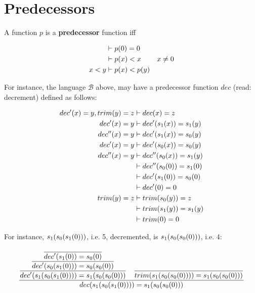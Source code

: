 \section{Predecessors}

\begin{definition}

A function $p$ is a \textbf{predecessor} function iff


\begin{align}
&\vdash p\p{0} = 0 \\
&\vdash p\p{x} < x & x \neq 0 \\
x < y &\vdash p\p{x} < p\p{y}
\end{align}

\end{definition}

For instance, the language $\mathcal{B}$ above, may have a predecessor function
$dec$ (read: decrement) defined as follows:

\begin{align}
dec'\p{x}=y, trim\p{y}=z &\vdash dec\p{x} = z \\
dec'\p{x} = y &\vdash dec'\p{s_1\p{x}} = s_1\p{y} \\
dec''\p{x} = y &\vdash dec'\p{s_1\p{x}} = s_0\p{y} \\
dec'\p{x} = y &\vdash dec'\p{s_0\p{x}} = s_0\p{y} \\
dec''\p{x} = y &\vdash dec''\p{s_0\p{x}} = s_1\p{y} \\
&\vdash dec''\p{s_0\p{0}} = s_1\p{0} \\
&\vdash dec'\p{s_1\p{0}} = s_0\p{0} \\
&\vdash dec'\p{0} = 0 \\
trim\p{y} = z &\vdash trim\p{s_0\p{y}} = z \\
&\vdash trim\p{s_1\p{y}} = s_1\p{y} \\
&\vdash trim\p{0} = 0
\end{align}

For instance, $s_1\p{s_0\p{s_1\p{0}}}$, i.e. 5, decremented, is
$s_1\p{s_0\p{s_0\p{0}}}$, i.e. 4:

$$
\judgement{
  \judgement{
    \judgement{
      \axiom{
        dec'\p{s_1\p{0}} = s_0\p{0}
      }
    }{
      dec'\p{s_0\p{s_1\p{0}}} = s_0\p{s_0\p{0}}
    }
  }{
    dec'\p{s_1\p{s_0\p{s_1\p{0}}}} = s_1\p{s_0\p{s_0\p{0}}}
  }
  \quad
  \axiom{
    trim\p{s_1\p{s_0\p{s_0\p{0}}}} = s_1\p{s_0\p{s_0\p{0}}}
  }
}{
  dec\p{s_1\p{s_0\p{s_1\p{0}}}} = s_1\p{s_0\p{s_0\p{0}}}
}
$$

